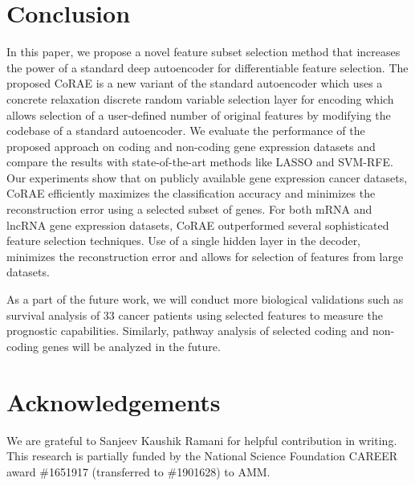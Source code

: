 \documentclass{bioinfo}
\begin{document}
\section{Conclusion}
In this paper, we propose a novel feature subset selection method that increases the power of a standard deep autoencoder for differentiable feature selection. 
The proposed CoRAE is a new variant of the standard autoencoder which uses a concrete relaxation discrete random variable selection layer for encoding which allows selection of a user-defined number of original features
by modifying the codebase of a standard autoencoder. We evaluate the performance of the proposed approach on coding and non-coding gene expression datasets and compare the results with state-of-the-art methods like LASSO and SVM-RFE.
Our experiments show that on publicly available gene expression cancer datasets, CoRAE efficiently maximizes the classification accuracy and minimizes the reconstruction error using a selected subset of genes.
For both mRNA and lncRNA gene expression datasets, CoRAE outperformed several sophisticated feature selection techniques.
Use of a single hidden layer in the decoder, minimizes the reconstruction error and allows for selection of features from large datasets.

As a part of the future work, we will conduct more biological validations such as survival analysis of 33 cancer patients using selected features to measure the prognostic capabilities.
Similarly, pathway analysis of selected coding and non-coding genes will be analyzed in the future.
\section*{Acknowledgements}
We are grateful to Sanjeev Kaushik Ramani for helpful contribution in writing.
This research is partially funded by the National Science Foundation CAREER award \#1651917 (transferred to \#1901628) to AMM.


%
%
%
%

\end{document}
